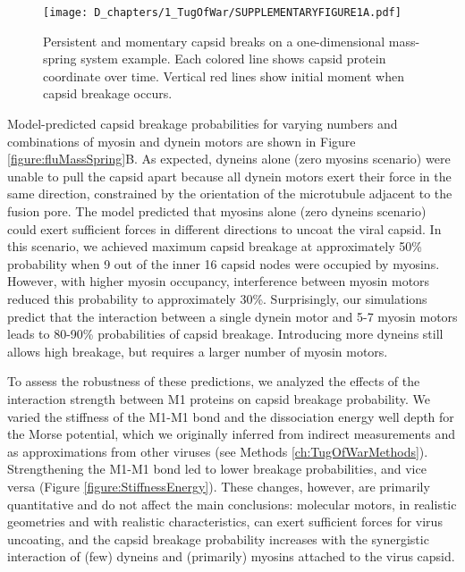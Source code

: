 \begin{figure}
\begin{center}
\texttt{[image: D\_chapters/1\_TugOfWar/SUPPLEMENTARYFIGURE1A.pdf]}
\caption[Persistent and momentary capsid breaks]%
{Persistent and momentary capsid breaks on a one-dimensional mass-spring system example. Each colored line shows capsid protein coordinate over time. Vertical red lines show initial moment when capsid breakage occurs.}
\label{figure:PersistentBreaks}
\end{center}
\end{figure}

Model-predicted capsid breakage probabilities for varying numbers and combinations of myosin and dynein motors are shown in Figure \ref{figure:fluMassSpring}B. As expected, dyneins alone (zero myosins scenario) were unable to pull the capsid apart because all dynein motors exert their force in the same direction, constrained by the orientation of the microtubule adjacent to the fusion pore. The model predicted that myosins alone (zero dyneins scenario) could exert sufficient forces in different directions to uncoat the viral capsid. In this scenario, we achieved maximum capsid breakage at approximately 50\% probability when 9 out of the inner 16 capsid nodes were occupied by myosins. However, with higher myosin occupancy, interference between myosin motors reduced this probability to approximately 30\%. Surprisingly, our simulations predict that the interaction between a single dynein motor and 5-7 myosin motors leads to 80-90\% probabilities of capsid breakage. Introducing more dyneins still allows high breakage, but requires a larger number of myosin motors.

To assess the robustness of these predictions, we analyzed the effects of the interaction strength between M1 proteins on capsid breakage probability. We varied the stiffness of the M1-M1 bond and the dissociation energy well depth for the Morse potential, which we originally inferred from indirect measurements and as approximations from other viruses (see Methods \ref{ch:TugOfWarMethods}). Strengthening the M1-M1 bond led to lower breakage probabilities, and vice versa (Figure \ref{figure:StiffnessEnergy}). These changes, however, are primarily quantitative and do not affect the main conclusions: molecular motors, in realistic geometries and with realistic characteristics, can exert sufficient forces for virus uncoating, and the capsid breakage probability increases with the synergistic interaction of (few) dyneins and (primarily) myosins attached to the virus capsid.

